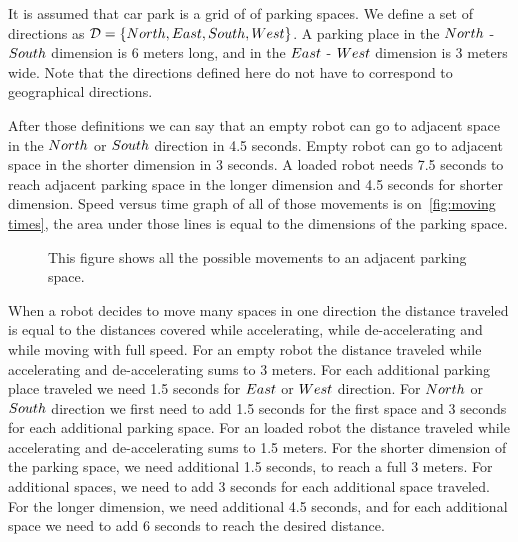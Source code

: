 It is assumed that car park is a grid of of parking spaces. We define a set of
directions as $\label{eq:dir}\mathcal{D} = \{North, East, South, West\}$. A parking place in the $North$ -
$South$ dimension is 6 meters long, and in the $East$ - $West$ dimension is 3
meters wide. Note that the directions defined here do not have to correspond to
geographical directions.

After those definitions we can say that an empty robot can go to adjacent space
in the $North$ or $South$ direction in 4.5 seconds. Empty robot can go to adjacent
space in the shorter dimension in 3 seconds. A loaded robot needs 7.5 seconds
to reach adjacent parking space in the longer dimension and 4.5 seconds for
shorter dimension. Speed versus time graph of all of those movements is
on~\autoref{fig:moving times}, the area under those lines is equal to the
dimensions of the parking space.
\begin{figure}[h]
    \begin{center}
        
        \caption{This figure shows all the possible movements to an adjacent
        parking space.}
        \label{fig:moving times}
    \end{center}
\end{figure}

When a robot decides to move many spaces in one direction the distance traveled
is equal to the distances covered while accelerating, while de-accelerating and
while moving with full speed. For an empty robot the distance traveled while
accelerating and de-accelerating sums to 3 meters. For each additional parking
place traveled we need 1.5 seconds for $East$ or $West$ direction. For $North$ or
$South$ direction we first need to add 1.5 seconds for the first space and 3
seconds for each additional parking space. For an loaded robot the distance traveled
while accelerating and de-accelerating sums to 1.5 meters. For the shorter
dimension of the parking space, we need additional 1.5 seconds, to reach a full 3
meters. For additional spaces, we need to add 3 seconds for each additional
space traveled. For the longer dimension, we need additional 4.5 seconds, and
for each additional space we need to add 6 seconds to reach the desired
distance.

